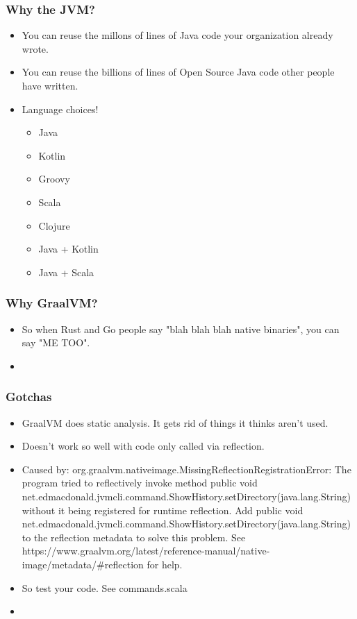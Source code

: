     \begin{frame}
        \frametitle{Why the JVM?}
        \begin{itemize}
            \item{You can reuse the millons of lines of Java code your organization already wrote.}\pause
            \item{You can reuse the billions of lines of Open Source Java code other people have written.}\pause
            \item{Language choices!}\pause
               \begin{itemize}
                  \item{Java}
                  \item{Kotlin}
                  \item{Groovy}
                  \item{Scala}
                  \item{Clojure}\pause
                  \item{Java + Kotlin}
                  \item{Java + Scala}
               \end{itemize}
        \end{itemize}
    \end{frame}

    \begin{frame}
        \frametitle{Why GraalVM?}
        \begin{itemize}
            \item{So when Rust and Go people say "blah blah blah native binaries", you can say "ME TOO".}\pause
            \item{}\pause
        \end{itemize}
    \end{frame}

    \begin{frame}
        \frametitle{Gotchas}
        \begin{itemize}
            \item{GraalVM does static analysis. It gets rid of things it thinks aren't used.}\pause
            \item{Doesn't work so well with code only called via reflection.}\pause
            \item{Caused by: org.graalvm.nativeimage.MissingReflectionRegistrationError: The program tried to reflectively invoke method public void net.edmacdonald.jvmcli.command.ShowHistory.setDirectory(java.lang.String) without it being registered for runtime reflection. Add public void net.edmacdonald.jvmcli.command.ShowHistory.setDirectory(java.lang.String) to the reflection metadata to solve this problem. See https://www.graalvm.org/latest/reference-manual/native-image/metadata/#reflection for help.}
            \item{So test your code. See commands.scala}\pause
            \item{}\pause
        \end{itemize}
    \end{frame}

